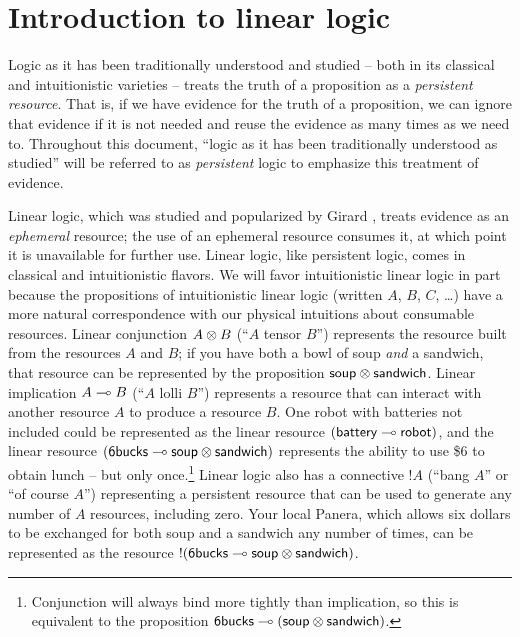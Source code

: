 

\section{Introduction to linear logic}
\label{sec:introlinlog}

Logic as it has been traditionally understood and studied -- both in
its classical and intuitionistic varieties -- treats the truth of a
proposition as a {\it persistent resource}. That is, if we have
evidence for the truth of a proposition, we can ignore that evidence
if it is not needed and reuse the evidence as many times as we need
to. Throughout this document, ``logic as it has been traditionally
understood as studied'' will be referred to as {\it persistent} logic
to emphasize this treatment of evidence. 

Linear logic, which was studied and popularized by Girard
\cite{girard87linear}, treats evidence as an {\it ephemeral} resource;
the use of an ephemeral resource consumes it, at which point it is
unavailable for further use.  Linear logic, like persistent logic,
comes in classical and intuitionistic flavors. We will favor
intuitionistic linear logic in part because the propositions of
intuitionistic linear logic (written $A$, $B$, $C$, \ldots) have a
more natural correspondence with our physical intuitions about
consumable resources. Linear conjunction $A \otimes B$ (``$A$ tensor
$B$'') represents the resource built from the resources $A$ and $B$;
if you have both a bowl of soup {\it and} a sandwich, that resource
can be represented by the proposition ${\sf soup} \otimes {\sf
  sandwich}$. Linear implication $A \multimap B$ (``$A$ lolli $B$'')
represents a resource that can interact with another resource $A$ to
produce a resource $B$. One robot with batteries not included could be
represented as the linear resource $({\sf battery} \multimap {\sf
  robot})$, and the linear resource $({\sf 6bucks} \multimap {\sf soup}
\otimes {\sf sandwich})$ represents the ability to use \$6 to obtain
lunch -- but only once.\footnote{Conjunction will always bind more
  tightly than implication, so this is equivalent to the proposition
  ${\sf 6bucks} \multimap ({\sf soup} \otimes {\sf sandwich})$.} Linear
logic also has a connective ${!}A$ (``bang $A$'' or ``of course $A$'')
representing a persistent resource that can be used to generate any
number of $A$ resources, including zero. Your local Panera, which
allows six dollars to be exchanged for both soup and a sandwich any
number of times, can be represented as the resource ${!}({\sf 6bucks}
\multimap {\sf soup} \otimes {\sf sandwich})$.

